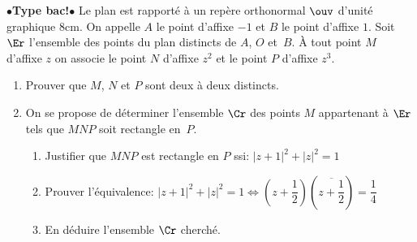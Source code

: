 \begin{exercice}
$\bullet$\textbf{Type bac!}$\bullet$ Le plan est rapport\'e \`a un rep\`ere
  orthonormal $\ouv$ d'unit\'e graphique 8cm. On appelle $A$ le point
  d'affixe $-1$ et $B$ le point d'affixe $1$. Soit $\Er$ l'ensemble
  des points du plan distincts de $A$, $O$ et~$B$. \`A tout point $M$
  d'affixe $z$ on associe le point $N$ d'affixe $z^2$ et le point $P$
  d'affixe $z^3$.
  \begin{enumerate}
  \item Prouver que $M$, $N$ et $P$ sont deux \`a deux distincts.

  \item On se propose de d\'eterminer l'ensemble $\Cr$ des points $M$
    appartenant \`a $\Er$ tels que $MNP$ soit rectangle en~$P$.
    \begin{enumerate}
    \item Justifier que $MNP$ est rectangle en $P$ ssi: $|z+1|^2+|z|^2=1$
    \item Prouver l'\'equivalence: $|z+1|^2+|z|^2=1\iff \left(z+\dfrac12\right)\left(\overline{z+\dfrac12}\right)=\dfrac14$
    \item En d\'eduire l'ensemble $\Cr$ cherch\'e.
    \end{enumerate}

\end{enumerate}
 
\end{exercice}
